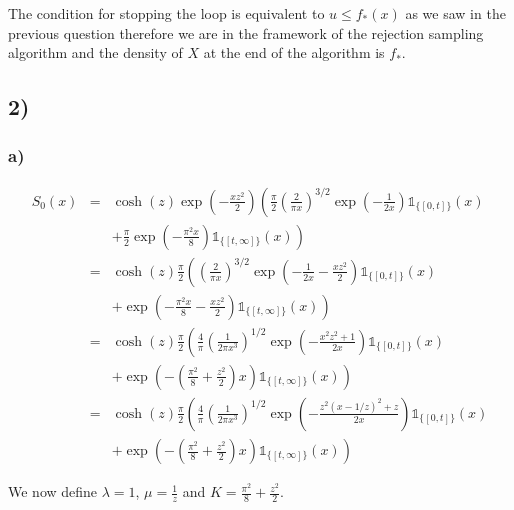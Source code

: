 \begin{algorithm}[H]
\end{algorithm}


The condition for stopping the loop is equivalent to $u \leq f_*(x)$ as we saw in the previous question therefore we are in the framework of the rejection sampling algorithm and the density of $X$ at the end of the algorithm is $f_*$.

\subsection*{2)}
\subsubsection*{a)}

\begin{eqnarray*}
	S_0(x) &=& \cosh(z)\exp\left(-\frac{xz^2}{2}\right)\left( \frac{\pi}{2} \left( \frac{2}{\pi x} \right)^{3/2} \exp\left( -\frac{1}{2x}  \right) \mathbb{1}_{\{[0,t]\}}(x)\right.\\
&& \left.+ \frac{\pi}{2} \exp\left( -\frac{\pi^2 x}{8}  \right) \mathbb{1}_{\{[t,\infty]\}}(x)\right)\\
&=& \cosh(z)\frac{\pi}{2} \left( \left( \frac{2}{\pi x} \right)^{3/2} \exp\left( -\frac{1}{2x} -\frac{xz^2}{2} \right) \mathbb{1}_{\{[0,t]\}}(x)\right.\\
&& \left.+ \exp\left( -\frac{\pi^2 x}{8}  -\frac{xz^2}{2}\right) \mathbb{1}_{\{[t,\infty]\}}(x)\right)\\
&=& \cosh(z)\frac{\pi}{2} \left( \frac{4}{\pi} \left( \frac{1}{2\pi x^3} \right)^{1/2} \exp\left( -\frac{x^2z^2 + 1}{2x} \right) \mathbb{1}_{\{[0,t]\}}(x)\right.\\
&& \left.+ \exp\left( -\left(\frac{\pi^2}{8}+\frac{z^2}{2}\right)x\right) \mathbb{1}_{\{[t,\infty]\}}(x)\right)\\
&=& \cosh(z)\frac{\pi}{2} \left( \frac{4}{\pi} \left( \frac{1}{2\pi x^3} \right)^{1/2} \exp\left( -\frac{z^2(x - 1/z)^2 + z}{2x} \right) \mathbb{1}_{\{[0,t]\}}(x)\right.\\
&& \left.+ \exp\left( -\left(\frac{\pi^2}{8}+\frac{z^2}{2}\right)x\right) \mathbb{1}_{\{[t,\infty]\}}(x)\right)
\end{eqnarray*}


We now define $\lambda = 1$, $\mu = \frac{1}{z}$ and $K = \frac{\pi^2}{8} + \frac{z^2}{2}$.

